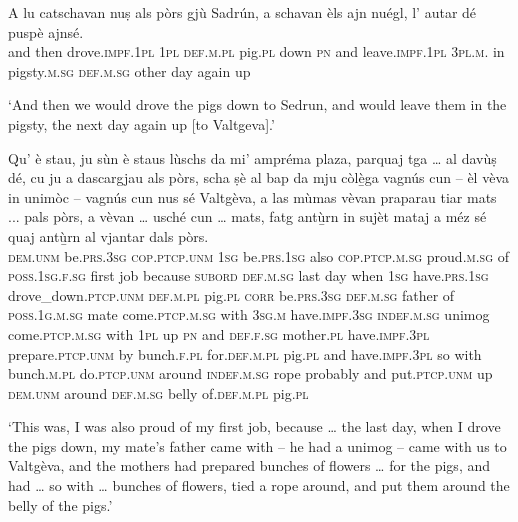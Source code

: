 \begin{linenumbers}
	\gll    A lu catschavan nuṣ als pòrs gjù Sadrún, a schavan èls ajn nuégl, l’ autar dé puspè ajnsé.\\
	and then drove.\textsc{impf.1pl}  \textsc{1pl}  \textsc{def.m.pl}  pig.\textsc{pl} down  \textsc{pn} and leave.\textsc{impf.1pl} \textsc{3pl.m.} in pigsty.\textsc{m.sg} \textsc{def.m.sg} other day again up\\
\end{linenumbers}
\medskip
\glt `And then we would drove the pigs down to Sedrun, and would leave them in the pigsty, the next day again up [to Valtgeva].'
\medskip


\begin{linenumbers}
	\gll    Qu’ è stau, ju sùn è staus lùschs da mi’ ampréma plaza, parquaj tga … al davùṣ dé, cu ju a dascargjau als pòrs, scha ṣè al bap da mju còlè̱ga vagnús cun – èl vèva in unimòc – vagnús cun nus sé Valtgèva, a las mùmas vèvan praparau tiar mats\footnotemark{} ... pals pòrs, a vèvan … usché cun … mats, fatg antù̱rn in sujèt mataj a méz sé quaj antù̱rn al vjantar dals pòrs.\\
	\textsc{dem.unm} be.\textsc{prs.3sg}  \textsc{cop.ptcp.unm} \textsc{1sg}  be.\textsc{prs.1sg} also \textsc{cop.ptcp.m.sg} proud.\textsc{m.sg} of  \textsc{poss.1sg.f.sg} first job because \textsc{subord} {} \textsc{def.m.sg} last day when \textsc{1sg} have.\textsc{prs.1sg}  drove\_down.\textsc{ptcp.unm} \textsc{def.m.pl} pig.\textsc{pl} \textsc{corr} be.\textsc{prs.3sg}  \textsc{def.m.sg} father of  \textsc{poss.1g.m.sg} mate come.\textsc{ptcp.m.sg} with {} \textsc{3sg.m} have.\textsc{impf.3sg}  \textsc{indef.m.sg} unimog {} come.\textsc{ptcp.m.sg} with \textsc{1pl} up \textsc{pn} and \textsc{def.f.sg} mother.\textsc{pl} have.\textsc{impf.3pl}  prepare.\textsc{ptcp.unm} by bunch.\textsc{f.pl} {} for.\textsc{def.m.pl} pig.\textsc{pl} and have.\textsc{impf.3pl} {} so with {} bunch.\textsc{m.pl}  do.\textsc{ptcp.unm} around \textsc{indef.m.sg} rope probably and put.\textsc{ptcp.unm} up  \textsc{dem.unm} around \textsc{def.m.sg} belly of.\textsc{def.m.pl} pig.\textsc{pl} \\
\end{linenumbers}
\medskip
\glt `This was, I was also proud of my first job, because … the last day, when I drove the pigs down, my mate’s father came with – he had a unimog – came with us to Valtgèva, and the mothers had prepared bunches of flowers … for the pigs, and had … so with … bunches of flowers, tied a rope around, and put them around the belly of the pigs.'
\medskip

